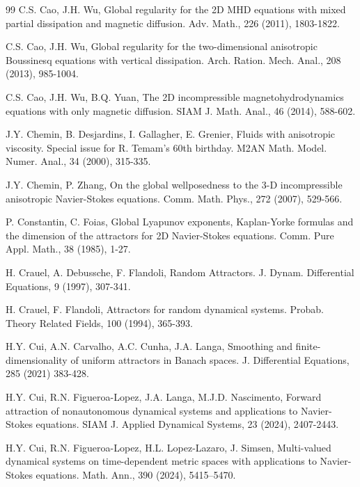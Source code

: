 \documentclass{elsarticle}
\theoremstyle{definition}
\numberwithin{equation}{section}
\begin{document}
\begin{thebibliography}{99}
C.S. Cao, J.H. Wu, Global regularity for the 2D MHD equations with mixed partial dissipation and magnetic diffusion. Adv. Math., 226 (2011), 1803-1822.


C.S. Cao, J.H. Wu,  Global regularity for the two-dimensional anisotropic Boussinesq equations with vertical dissipation. Arch. Ration. Mech. Anal., 208 (2013), 985-1004.

C.S. Cao, J.H. Wu, B.Q. Yuan, The 2D incompressible magnetohydrodynamics equations with only magnetic diffusion. SIAM J. Math. Anal., 46 (2014), 588-602.



J.Y. Chemin, B. Desjardins, I. Gallagher, E. Grenier,  Fluids with anisotropic viscosity. Special issue for R. Temam's 60th birthday. M2AN Math. Model. Numer. Anal., 34 (2000), 315-335.

 J.Y. Chemin, P. Zhang,  On the global wellposedness to the 3-D incompressible anisotropic Navier-Stokes equations. Comm. Math. Phys., 272 (2007), 529-566.



 P. Constantin, C. Foias,    Global Lyapunov exponents, Kaplan-Yorke formulas and the dimension of the attractors for 2D Navier-Stokes equations.  Comm. Pure Appl. Math., 38 (1985), 1-27.




H. Crauel, A. Debussche, F. Flandoli,    Random Attractors.  J. Dynam. Differential Equations,  9 (1997), 307-341.


H. Crauel, F. Flandoli,    Attractors for random dynamical systems.  Probab. Theory Related Fields, 100 (1994), 365-393.

 H.Y. Cui, A.N. Carvalho, A.C. Cunha, J.A. Langa,    Smoothing and finite-dimensionality of uniform attractors in Banach spaces. J. Differential Equations, 285 (2021) 383-428.



 H.Y.  Cui, R.N. Figueroa-Lopez, J.A. Langa, M.J.D. Nascimento,  Forward attraction of nonautonomous dynamical systems and applications to Navier-Stokes equations. SIAM J. Applied Dynamical Systems,   23 (2024), 2407-2443.


 H.Y. Cui,   R.N. Figueroa-Lopez,  H.L. Lopez-Lazaro,  J. Simsen,  Multi-valued dynamical systems on time-dependent metric spaces with applications to Navier-Stokes equations. Math. Ann., 390 (2024), 5415–5470.


\end{thebibliography}
\end{document}
